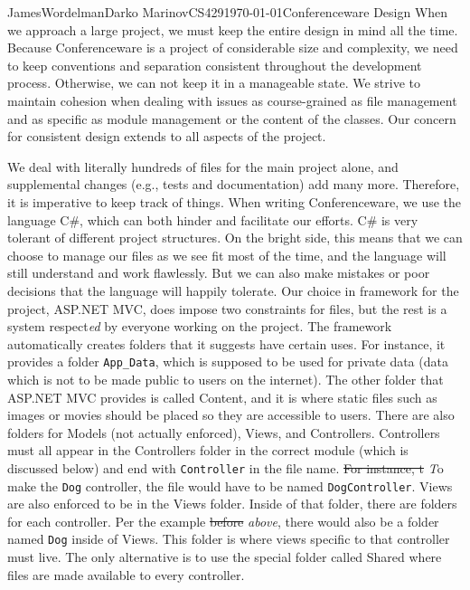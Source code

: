 \documentclass[12pt,letterpaper]{article}
\begin{document}
\begin{mla}{James}{Wordelman}{Darko Marinov}{CS429}{\today}{Conferenceware
Design}
When we approach a large project, we must keep the entire design in mind all the time. Because Conferenceware is a project of considerable size and complexity, we need to keep conventions and separation consistent throughout the development process. Otherwise, we can not keep it 
in a manageable state. We strive to maintain cohesion when dealing with issues as course-grained as file management and as specific as module management or the content of the classes.  Our concern for consistent design extends to all aspects of the project.

We deal with literally hundreds of files for the main project alone, and supplemental changes (e.g., tests and documentation) add many more. Therefore, it is imperative to keep track of things. When writing Conferenceware, we use the language C\#, which can both hinder and facilitate our efforts.  C\# is very tolerant of different project structures. On the bright side, this means that we can choose to manage our files as we see fit most of the time, and the language will still understand and work flawlessly. But we can also make mistakes or poor decisions that the language will happily tolerate. Our choice in framework for the project, ASP.NET MVC, does impose two constraints for files, but the rest is a system respect\textit{ed} by everyone working on the project. The framework automatically creates folders that it suggests have certain uses. For instance, it provides a folder \texttt{App\_Data}, which is supposed to be used for private data (data which is not to be made
public to users on the internet).  The other folder that ASP.NET MVC provides is called Content, and it is where static files such as images or movies should be placed so they are accessible to users. There are also folders for Models (not actually enforced), Views, and Controllers. Controllers must all appear in the Controllers folder in the correct module (which is discussed below) and end with \texttt{Controller} in the file name. \sout{For instance, t} \textit{T}o make the \texttt{Dog} controller, the file would have to be named \texttt{DogController}. Views are also enforced to be in the Views folder. Inside of that folder, there are folders for each controller. Per the example \sout{before} \textit{above}, there would also be a folder named \texttt{Dog} inside of Views. This folder is where views specific to that controller must live. The only alternative is to use the special folder called Shared where files are made available to every controller.


\end{mla}
\end{document}
